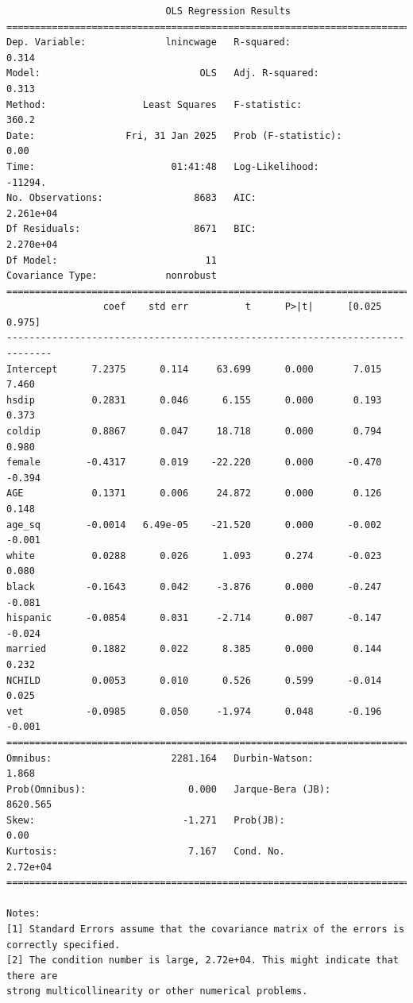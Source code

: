 \documentclass[
  letterpaper,
  DIV=11,
  numbers=noendperiod]{scrartcl}
\begin{document}
\begin{verbatim}
                            OLS Regression Results                            
==============================================================================
Dep. Variable:              lnincwage   R-squared:                       0.314
Model:                            OLS   Adj. R-squared:                  0.313
Method:                 Least Squares   F-statistic:                     360.2
Date:                Fri, 31 Jan 2025   Prob (F-statistic):               0.00
Time:                        01:41:48   Log-Likelihood:                -11294.
No. Observations:                8683   AIC:                         2.261e+04
Df Residuals:                    8671   BIC:                         2.270e+04
Df Model:                          11                                         
Covariance Type:            nonrobust                                         
==============================================================================
                 coef    std err          t      P>|t|      [0.025      0.975]
------------------------------------------------------------------------------
Intercept      7.2375      0.114     63.699      0.000       7.015       7.460
hsdip          0.2831      0.046      6.155      0.000       0.193       0.373
coldip         0.8867      0.047     18.718      0.000       0.794       0.980
female        -0.4317      0.019    -22.220      0.000      -0.470      -0.394
AGE            0.1371      0.006     24.872      0.000       0.126       0.148
age_sq        -0.0014   6.49e-05    -21.520      0.000      -0.002      -0.001
white          0.0288      0.026      1.093      0.274      -0.023       0.080
black         -0.1643      0.042     -3.876      0.000      -0.247      -0.081
hispanic      -0.0854      0.031     -2.714      0.007      -0.147      -0.024
married        0.1882      0.022      8.385      0.000       0.144       0.232
NCHILD         0.0053      0.010      0.526      0.599      -0.014       0.025
vet           -0.0985      0.050     -1.974      0.048      -0.196      -0.001
==============================================================================
Omnibus:                     2281.164   Durbin-Watson:                   1.868
Prob(Omnibus):                  0.000   Jarque-Bera (JB):             8620.565
Skew:                          -1.271   Prob(JB):                         0.00
Kurtosis:                       7.167   Cond. No.                     2.72e+04
==============================================================================

Notes:
[1] Standard Errors assume that the covariance matrix of the errors is correctly specified.
[2] The condition number is large, 2.72e+04. This might indicate that there are
strong multicollinearity or other numerical problems.
\end{verbatim}
\end{document}
